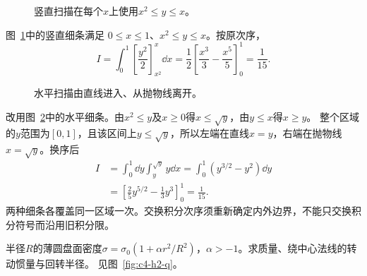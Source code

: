 \begin{figure}[H]\centering
{}
\caption{竖直扫描在每个$x$上使用$x^2\le y\le x$。}\label{fig:c4-h1-q}
\end{figure}
\begin{solution}
图~\ref{fig:c4-h1-q}中的竖直细条满足
$0\le x\le1$、$x^2\le y\le x$。按原次序，
\[
 I=\int_0^1\left[\frac{y^2}{2}\right]_{x^2}^x\dd x
 =\frac12\left[\frac{x^3}{3}-\frac{x^5}{5}\right]_0^1
 =\frac1{15}.
\]
\begin{figure}[H]\centering
{}
\caption{水平扫描由直线进入、从抛物线离开。}\label{fig:c4-h1-s}
\end{figure}
改用图~\ref{fig:c4-h1-s}中的水平细条。由$x^2\le y$及$x\ge0$得$x\le\sqrt y$，由$y\le x$得$x\ge y$。
整个区域的$y$范围为$[0,1]$，且该区间上$y\le\sqrt y$，所以左端在直线$x=y$，右端在抛物线$x=\sqrt y$。换序后
\[
 \begin{aligned}
 I&=\int_0^1\dd y\int_y^{\sqrt y}y\dd x
 =\int_0^1(y^{3/2}-y^2)\dd y\\
 &=\left[\frac25y^{5/2}-\frac13y^3\right]_0^1
 =\boxed{\frac1{15}}.
 \end{aligned}
\]
两种细条各覆盖同一区域一次。交换积分次序须重新确定内外边界，不能只交换积分符号而沿用旧积分限。
\end{solution}

\begin{exercise}[圆环薄片的转动惯量]\label{ex:c4-h2}
半径$R$的薄圆盘面密度$\sigma=\sigma_0(1+\alpha r^2/R^2)$，$\alpha>-1$。求质量、绕中心法线的转动惯量与回转半径。 见图~\ref{fig:c4-h2-q}。
\end{exercise}

